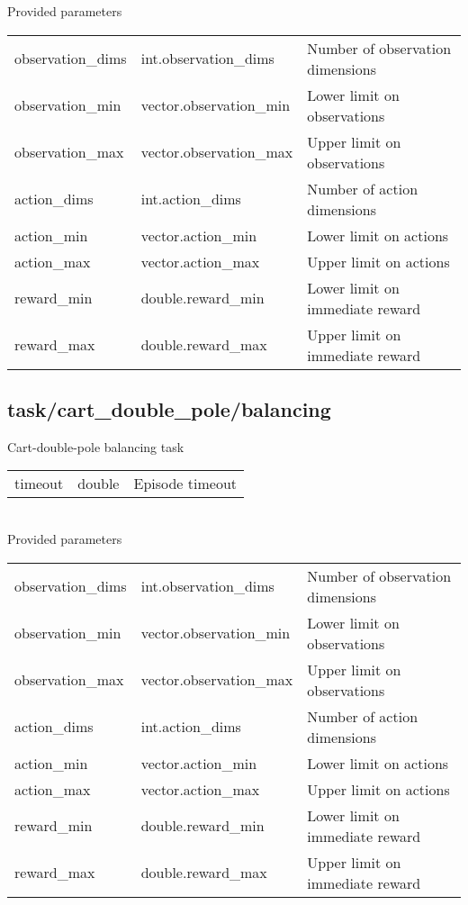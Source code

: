 \noindent Provided parameters\\

\noindent\begin{tabular}{@{}lll@{}}
observation\_dims&int.observation\_dims&Number of observation dimensions\\
observation\_min&vector.observation\_min&Lower limit on observations\\
observation\_max&vector.observation\_max&Upper limit on observations\\
action\_dims&int.action\_dims&Number of action dimensions\\
action\_min&vector.action\_min&Lower limit on actions\\
action\_max&vector.action\_max&Upper limit on actions\\
reward\_min&double.reward\_min&Lower limit on immediate reward\\
reward\_max&double.reward\_max&Upper limit on immediate reward\\
\end{tabular}
\subsection{task/cart\_double\_pole/balancing}
\noindent Cart-double-pole balancing task\\

\noindent\begin{tabular}{@{}lll@{}}
timeout&double&Episode timeout\\
\end{tabular}
\\

\noindent Provided parameters\\

\noindent\begin{tabular}{@{}lll@{}}
observation\_dims&int.observation\_dims&Number of observation dimensions\\
observation\_min&vector.observation\_min&Lower limit on observations\\
observation\_max&vector.observation\_max&Upper limit on observations\\
action\_dims&int.action\_dims&Number of action dimensions\\
action\_min&vector.action\_min&Lower limit on actions\\
action\_max&vector.action\_max&Upper limit on actions\\
reward\_min&double.reward\_min&Lower limit on immediate reward\\
reward\_max&double.reward\_max&Upper limit on immediate reward\\
\end{tabular}
